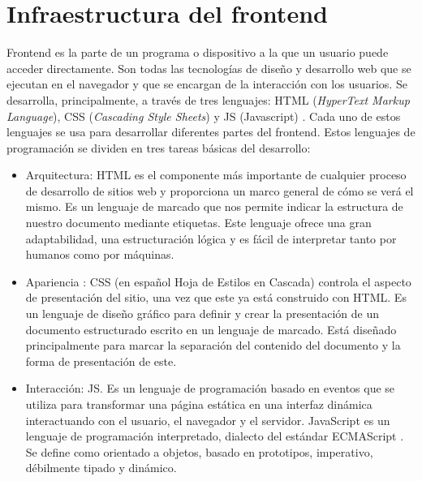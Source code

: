\section{Infraestructura del frontend}

Frontend es la parte de un programa o dispositivo a la que un usuario puede acceder directamente. Son todas las tecnologías de diseño y desarrollo web que se ejecutan en el navegador y que se encargan de la interacción con los usuarios.  Se desarrolla, principalmente, a través de tres lenguajes: HTML (\textit{HyperText Markup Language}), CSS (\textit{Cascading Style Sheets}) \citep{WEBSITE:26} y JS (Javascript) \citep{WEBSITE:27} . Cada uno de estos lenguajes se usa para desarrollar diferentes partes del frontend.  Estos lenguajes de programación se dividen en tres tareas básicas del desarrollo:

\begin{itemize}
	\item Arquitectura: HTML es el componente más importante de cualquier proceso de desarrollo de sitios web y proporciona un marco general de cómo se verá el mismo. Es un lenguaje de marcado que nos permite indicar la estructura de nuestro documento mediante etiquetas. Este lenguaje ofrece una gran adaptabilidad, una estructuración lógica y es fácil de interpretar tanto por humanos como por máquinas.
	
	\item Apariencia : CSS (en español Hoja de Estilos en Cascada) controla el aspecto de presentación del sitio, una vez que este ya está construido con HTML.  Es un lenguaje de diseño gráfico para definir y crear la presentación de un documento estructurado escrito en un lenguaje de marcado. Está diseñado principalmente para marcar la separación del contenido del documento y la forma de presentación de este.
	
	\item Interacción: JS.  Es un lenguaje de programación basado en eventos que se utiliza para transformar una página estática en una interfaz dinámica interactuando con el usuario, el navegador y el servidor.  JavaScript es un lenguaje de programación interpretado, dialecto del estándar ECMAScript \citep{WEBSITE:28}.  Se define como orientado a objetos, basado en prototipos, imperativo, débilmente tipado y dinámico.
	
\end{itemize}

